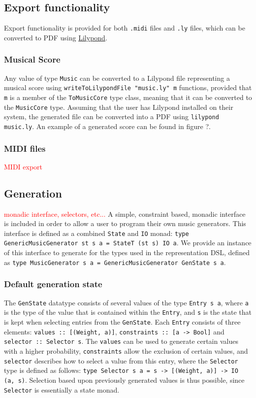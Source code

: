 \documentclass[11pt,a4paper]{article}
\newcommand{\icode}[1]{\texttt{#1}}
\newcommand\todo[1]{\textcolor{red}{#1}}
\begin{document}
\subsection{Export functionality}
Export functionality is provided for both \texttt{.midi} files and \texttt{.ly} files, which can be converted to PDF using \href{https://lilypond.org}{Lilypond}.

\subsubsection{Musical Score}
Any value of type \icode{Music} can be converted to a Lilypond file representing a musical score using \icode{writeToLilypondFile "music.ly" m} functions, provided that \icode{m} is a member of the \icode{ToMusicCore} type class, meaning that it can be converted to the \icode{MusicCore} type. Assuming that the user has Lilypond installed on their system, the generated file can be converted into a PDF using \icode{lilypond music.ly}. An example of a generated score can be found in figure ?.
\subsubsection{MIDI files}
\todo{MIDI export}

\subsection{Generation}
\todo{monadic interface, selectors, etc...}
A simple, constraint based, monadic interface is included in order to allow a user to program their own music generators. This interface is defined as a combined \icode{State} and \icode{IO} monad: \icode{type GenericMusicGenerator st s a = StateT (st s) IO a}. We provide an instance of this interface to generate for the types used in the representation DSL, defined as \icode{type MusicGenerator s a = GenericMusicGenerator GenState s a}.

\subsubsection{Default generation state}
The \icode{GenState} datatype consists of several values of the type \icode{Entry s a}, where \icode{a} is the type of the value that is contained within the \icode{Entry}, and \icode{s} is the state that is kept when selecting entries from the \icode{GenState}. Each \icode{Entry} consists of three elements: \icode{values :: [(Weight, a)]}, \icode{constraints :: [a -> Bool]} and \icode{selector :: Selector s}. The \icode{values} can be used to generate certain values with a higher probability, \icode{constraints} allow the exclusion of certain values, and \icode{selector} describes how to select a value from this entry, where the \icode{Selector} type is defined as follows: \icode{type Selector s a = s -> [(Weight, a)] -> IO (a, s)}. Selection based upon previously generated values is thus possible, since \icode{Selector} is essentially a state monad.
\end{document}
